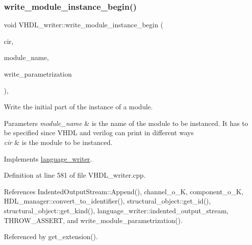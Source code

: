 \subsubsection{\texorpdfstring{write\+\_\+module\+\_\+instance\+\_\+begin()}{write\_module\_instance\_begin()}}
{\footnotesize\ttfamily void V\+H\+D\+L\+\_\+writer\+::write\+\_\+module\+\_\+instance\+\_\+begin (\begin{DoxyParamCaption}\item[{const \hyperlink{structural__objects_8hpp_a8ea5f8cc50ab8f4c31e2751074ff60b2}{structural\+\_\+object\+Ref} \&}]{cir,  }\item[{const std\+::string \&}]{module\+\_\+name,  }\item[{bool}]{write\+\_\+parametrization }\end{DoxyParamCaption})\hspace{0.3cm}{\ttfamily [override]}, {\ttfamily [virtual]}}



Write the initial part of the instance of a module. 


\begin{DoxyParams}{Parameters}
{\em module\+\_\+name} & is the name of the module to be instanced. It has to be specified since V\+H\+DL and verilog can print in different ways \\
\hline
{\em cir} & is the module to be instanced. \\
\hline
\end{DoxyParams}


Implements \hyperlink{classlanguage__writer_a9fa5dba07a53f84fb2936c0c46a511a4}{language\+\_\+writer}.



Definition at line 581 of file V\+H\+D\+L\+\_\+writer.\+cpp.



References Indented\+Output\+Stream\+::\+Append(), channel\+\_\+o\+\_\+K, component\+\_\+o\+\_\+K, H\+D\+L\+\_\+manager\+::convert\+\_\+to\+\_\+identifier(), structural\+\_\+object\+::get\+\_\+id(), structural\+\_\+object\+::get\+\_\+kind(), language\+\_\+writer\+::indented\+\_\+output\+\_\+stream, T\+H\+R\+O\+W\+\_\+\+A\+S\+S\+E\+RT, and write\+\_\+module\+\_\+parametrization().



Referenced by get\+\_\+extension().

